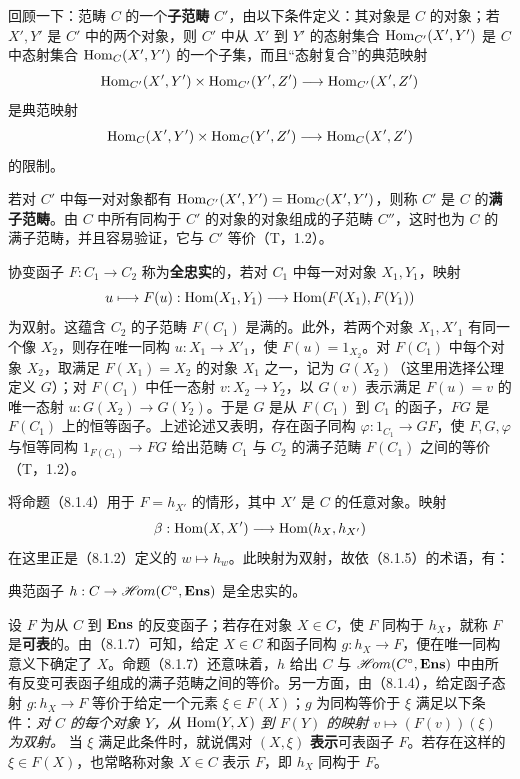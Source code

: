 回顾一下：范畴 $C$ 的一个\textbf{子范畴} $C'$，由以下条件定义：其对象是 $C$ 的对象；若 $X',Y'$ 是 $C'$ 中的两个对象，则 $C'$ 中从 $X'$ 到 $Y'$ 的态射集合 $\operatorname{Hom}_{C'}(X',Y')$ 是 $C$ 中态射集合 $\operatorname{Hom}_C(X',Y')$ 的一个子集，而且“态射复合”的典范映射
\[
\operatorname{Hom}_{C'}(X',Y')\times\operatorname{Hom}_{C'}(Y',Z')\longrightarrow\operatorname{Hom}_{C'}(X',Z')
\]
是典范映射
\[
\operatorname{Hom}_C(X',Y')\times\operatorname{Hom}_C(Y',Z')\longrightarrow\operatorname{Hom}_C(X',Z')
\]
的限制。

若对 $C'$ 中每一对对象都有 $\operatorname{Hom}_{C'}(X',Y')=\operatorname{Hom}_C(X',Y')$，则称 $C'$ 是 $C$ 的\textbf{满子范畴}。由 $C$ 中所有同构于 $C'$ 的对象的对象组成的子范畴 $C''$，这时也为 $C$ 的满子范畴，并且容易验证，它与 $C'$ 等价（T，1.2）。

协变函子 $F:C_1\to C_2$ 称为\textbf{全忠实}的，若对 $C_1$ 中每一对对象 $X_1,Y_1$，映射
\[
u\longmapsto F(u):\operatorname{Hom}(X_1,Y_1)\longrightarrow\operatorname{Hom}(F(X_1),F(Y_1))
\]
为双射。这蕴含 $C_2$ 的子范畴 $F(C_1)$ 是满的。此外，若两个对象 $X_1,X'_1$ 有同一个像 $X_2$，则存在唯一同构 $u:X_1\to X'_1$，使 $F(u)=1_{X_2}$。对 $F(C_1)$ 中每个对象 $X_2$，取满足 $F(X_1)=X_2$ 的对象 $X_1$ 之一，记为 $G(X_2)$（这里用选择公理定义 $G$）；对 $F(C_1)$ 中任一态射 $v:X_2\to Y_2$，以 $G(v)$ 表示满足 $F(u)=v$ 的唯一态射 $u:G(X_2)\to G(Y_2)$。于是 $G$ 是从 $F(C_1)$ 到 $C_1$ 的函子，$FG$ 是 $F(C_1)$ 上的恒等函子。上述论述又表明，存在函子同构 $\varphi:1_{C_1}\to GF$，使 $F,G,\varphi$ 与恒等同构 $1_{F(C_1)}\to FG$ 给出范畴 $C_1$ 与 $C_2$ 的满子范畴 $F(C_1)$ 之间的等价（T，1.2）。

将命题（8.1.4）用于 $F=h_{X'}$ 的情形，其中 $X'$ 是 $C$ 的任意对象。映射
\[
\beta:\operatorname{Hom}(X,X')\longrightarrow\operatorname{Hom}(h_X,h_{X'})
\]
在这里正是（8.1.2）定义的 $w\mapsto h_w$。此映射为双射，故依（8.1.5）的术语，有：

典范函子 $h:C\to\mathscr{H}\!om(C^\circ,\mathbf{Ens})$ 是全忠实的。

设 $F$ 为从 $C$ 到 $\mathbf{Ens}$ 的反变函子；若存在对象 $X\in C$，使 $F$ 同构于 $h_X$，就称 $F$ 是\textbf{可表}的。由（8.1.7）可知，给定 $X\in C$ 和函子同构 $g:h_X\to F$，便在唯一同构意义下确定了 $X$。命题（8.1.7）还意味着，$h$ 给出 $C$ 与 $\mathscr{H}\!om(C^\circ,\mathbf{Ens})$ 中由所有反变可表函子组成的满子范畴之间的等价。另一方面，由（8.1.4），给定函子态射 $g:h_X\to F$ 等价于给定一个元素 $\xi\in F(X)$；$g$ 为同构等价于 $\xi$ 满足以下条件：\emph{对 $C$ 的每个对象 $Y$，从 $\operatorname{Hom}(Y,X)$ 到 $F(Y)$ 的映射 $v\mapsto(F(v))(\xi)$ 为双射。} 当 $\xi$ 满足此条件时，就说偶对 $(X,\xi)$ \textbf{表示}可表函子 $F$。若存在这样的 $\xi\in F(X)$，也常略称对象 $X\in C$ 表示 $F$，即 $h_X$ 同构于 $F$。


